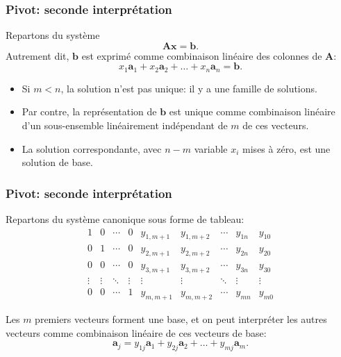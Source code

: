 \documentclass[t,usepdftitle=false]{beamer}
\def\ba{\boldsymbol{a}}
\def\bb{\boldsymbol{b}}
\def\bx{\boldsymbol{x}}
\def\bA{\boldsymbol{A}}
\begin{document}
\begin{frame}
\frametitle{Pivot: seconde interprétation}

Repartons du système
\[
\bA \bx = \bb.
\]
Autrement dit, $\bb$ est exprimé comme combinaison linéaire des colonnes de $\bA$:
\[
x_1 \ba_1 + x_2 \ba_2 + \ldots + x_n \ba_n = \bb.
\]

\mbox{}

\begin{itemize}
	\item 
Si $m < n$, la solution n'est pas unique: il y a une famille de solutions.
	\item 
Par contre, la représentation de $\bb$ est unique comme combinaison linéaire d'un sous-ensemble linéairement indépendant de $m$ de ces vecteurs.
	\item 
La solution correspondante, avec $n-m$ variable $x_i$ mises à zéro, est une solution de base.
\end{itemize}

\end{frame}

\begin{frame}
\frametitle{Pivot: seconde interprétation}

Repartons du système canonique sous forme de tableau:
\[
\begin{matrix}
1 & 0 & \cdots & 0 & y_{1,m+1} & y_{1,m+2} & \cdots & y_{1n} & y_{10} \\
0 & 1 & \cdots & 0 & y_{2,m+1} & y_{2,m+2} & \cdots & y_{2n} & y_{20} \\
0 & 0 & \cdots & 0 & y_{3,m+1} & y_{3,m+2} & \cdots & y_{3n} & y_{30} \\
\vdots & \vdots & \ddots & \vdots & \vdots & \vdots & \ddots & \vdots & \vdots \\
0 & 0 & \cdots & 1 & y_{m,m+1} & y_{m,m+2} & \cdots & y_{mn} & y_{m0}
\end{matrix}
\]

\mbox{}

Les $m$ premiers vecteurs forment une base, et on peut interpréter les autres vecteurs comme combinaison linéaire de ces vecteurs de base:
\[
\ba_j = y_{1j} \ba_1 + y_{2j} \ba_2 + \ldots + y_{mj} \ba_m.
\]

\end{frame}
\end{document}
